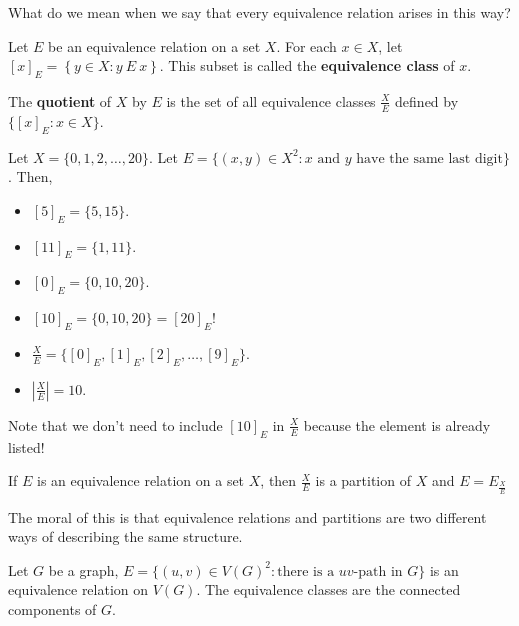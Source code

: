 
What do we mean when we say that every equivalence relation arises in this way?

\begin{definition}
	Let \( E \) be an equivalence relation on a set \( X \). For each \( x \in X \), let \( \left[ x \right]_E = \left\{ y \in X \colon y ~E~ x \right\}  \). This subset is called the \textbf{equivalence class} of \( x \).
\end{definition}

\begin{definition}
	The \textbf{quotient} of \( X \) by \( E \) is the set of all equivalence classes \( \frac{X}{E} \) defined by \( \{[x]_E \colon x \in X\}   \).
\end{definition}

\begin{eg}
	Let \( X = \{0,1,2,\ldots ,20\}   \). Let \( E=\{(x,y) \in X^2 \colon x \text{ and } y \text{ have the same last digit}\}   \). Then, 
	\begin{itemize}
		\item \( [5]_E =  \{5,15\}   \).
		\item \( [11]_E=\{1,11\}   \).
		\item \( [0]_E=\{0,10,20\}   \).
		\item \( [10]_E=\{0,10,20\}   =[20]_E\)!
		\item \( \frac{X}{E}=\{[0]_E,[1]_E,[2]_E,\ldots ,[9]_E\} \).
		\item \( |\frac{X}{E}|=10 \).
	\end{itemize}
	Note that we don't need to include \( [10]_E \) in \( \frac{X}{E} \) because the element is already listed!
\end{eg}

\begin{theorem}
	If \( E \) is an equivalence relation on a set \( X \), then \( \frac{X}{E} \) is a partition of \( X \) and \( E=E_{\frac{X}{E}} \)
\end{theorem}

The moral of this is that equivalence relations and partitions are two different ways of describing the same structure.

\begin{eg}
	Let \( G \) be a graph, \( E=\{(u,v) \in V(G)^2 \colon \text{there is a } uv\text{-path in }G \} \) is an equivalence relation on \( V(G) \). The equivalence classes are the connected components of \( G \).
\end{eg}


